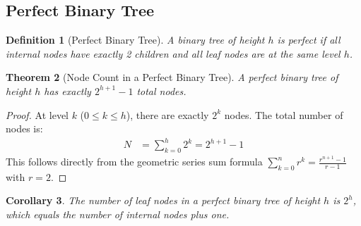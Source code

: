 \documentclass[10pt,journal,compsoc,onecolumn]{IEEEtran}
\newtheorem{theorem}{Theorem}
\newtheorem{definition}[theorem]{Definition}
\newtheorem{corollary}[theorem]{Corollary}
\begin{document}
\subsection{Perfect Binary Tree}
\begin{definition}[Perfect Binary Tree]
A binary tree of height $h$ is \emph{perfect} if all internal nodes have exactly 2 children and all leaf nodes are at the same level $h$.
\end{definition}

\begin{theorem}[Node Count in a Perfect Binary Tree]
A perfect binary tree of height $h$ has exactly $2^{h+1} - 1$ total nodes.
\end{theorem}
\begin{proof}
At level $k$ ($0 \le k \le h$), there are exactly $2^k$ nodes. The total number of nodes is:
\begin{align}
    N &= \sum_{k=0}^{h} 2^k = 2^{h+1} - 1
\end{align}
This follows directly from the geometric series sum formula $\sum_{k=0}^{n} r^k = \frac{r^{n+1} - 1}{r - 1}$ with $r = 2$.
\end{proof}

\begin{corollary}
The number of leaf nodes in a perfect binary tree of height $h$ is $2^h$, which equals the number of internal nodes plus one.
\end{corollary}
\end{document}
